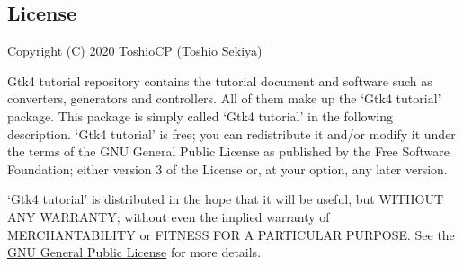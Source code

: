 \hypertarget{license}{%
\subsection{License}\label{license}}

Copyright (C) 2020 ToshioCP (Toshio Sekiya)

Gtk4 tutorial repository contains the tutorial document and software
such as converters, generators and controllers. All of them make up the
`Gtk4 tutorial' package. This package is simply called `Gtk4 tutorial'
in the following description. `Gtk4 tutorial' is free; you can
redistribute it and/or modify it under the terms of the GNU General
Public License as published by the Free Software Foundation; either
version 3 of the License or, at your option, any later version.

`Gtk4 tutorial' is distributed in the hope that it will be useful, but
WITHOUT ANY WARRANTY; without even the implied warranty of
MERCHANTABILITY or FITNESS FOR A PARTICULAR PURPOSE. See the
\href{https://www.gnu.org/licenses/gpl-3.0.html}{GNU General Public
License} for more details.
